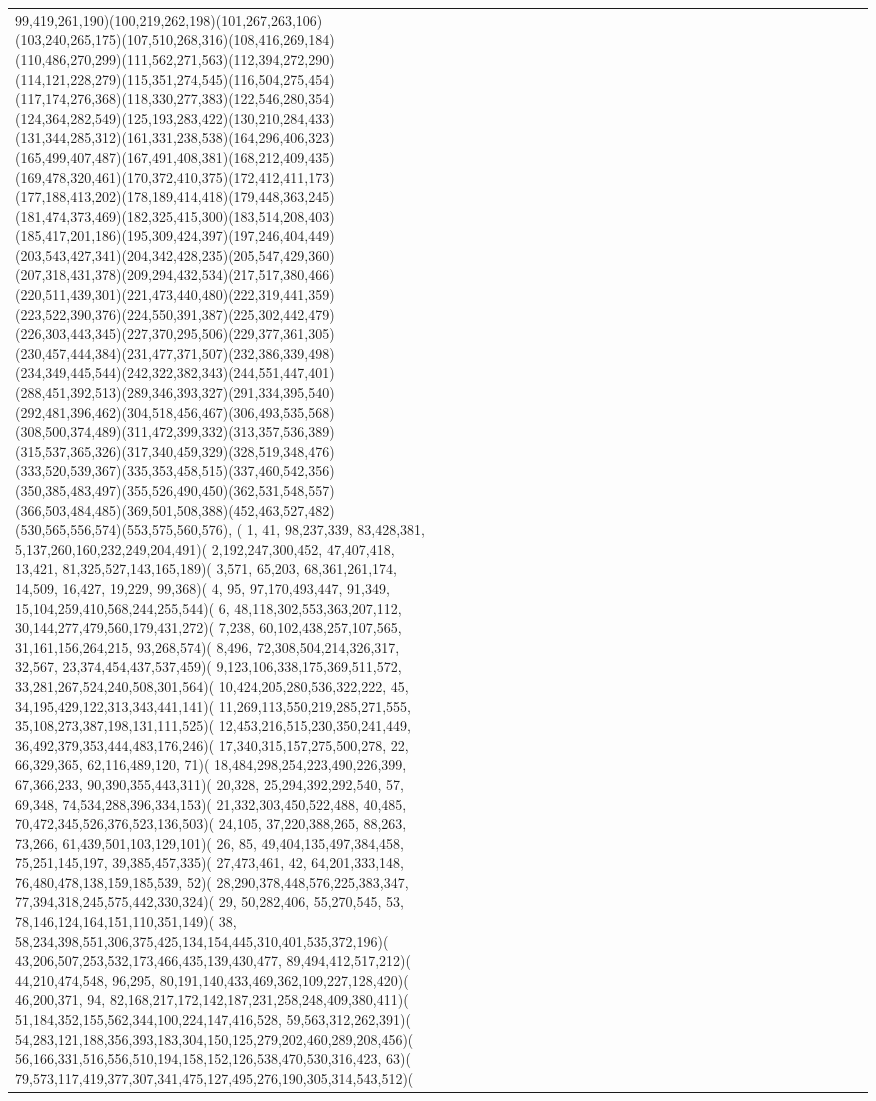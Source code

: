 \documentclass[varwidth=\maxdimen,border=10]{standalone}
\begin{document}
\begin{tabular}{@{}l@{}l@{}l@{}l@{}l@{}l@{}l@{}l@{}l@{}l@{}l@{}l@{}l@{}l@{}l@{}l@{}l@{}l@{}l@{}l@{}l@{}l@{}l@{}l@{}l@{}l@{}l@{}l@{}l@{}l@{}l@{}l@{}}
99,419,261,190)(100,219,262,198)(101,267,263,106)(103,240,265,175)(107,510,268,316)(108,416,269,184)(110,486,270,299)(111,562,271,563)(112,394,272,290)(114,121,228,279)(115,351,274,545)(116,504,275,454)(117,174,276,368)(118,330,277,383)(122,546,280,354)(124,364,282,549)(125,193,283,422)(130,210,284,433)(131,344,285,312)(161,331,238,538)(164,296,406,323)(165,499,407,487)(167,491,408,381)(168,212,409,435)(169,478,320,461)(170,372,410,375)(172,412,411,173)(177,188,413,202)(178,189,414,418)(179,448,363,245)(181,474,373,469)(182,325,415,300)(183,514,208,403)(185,417,201,186)(195,309,424,397)(197,246,404,449)(203,543,427,341)(204,342,428,235)(205,547,429,360)(207,318,431,378)(209,294,432,534)(217,517,380,466)(220,511,439,301)(221,473,440,480)(222,319,441,359)(223,522,390,376)(224,550,391,387)(225,302,442,479)(226,303,443,345)(227,370,295,506)(229,377,361,305)(230,457,444,384)(231,477,371,507)(232,386,339,498)(234,349,445,544)(242,322,382,343)(244,551,447,401)(288,451,392,513)(289,346,393,327)(291,334,395,540)(292,481,396,462)(304,518,456,467)(306,493,535,568)(308,500,374,489)(311,472,399,332)(313,357,536,389)(315,537,365,326)(317,340,459,329)(328,519,348,476)(333,520,539,367)(335,353,458,515)(337,460,542,356)(350,385,483,497)(355,526,490,450)(362,531,548,557)(366,503,484,485)(369,501,508,388)(452,463,527,482)(530,565,556,574)(553,575,560,576), (  1, 41, 98,237,339, 83,428,381,  5,137,260,160,232,249,204,491)(  2,192,247,300,452, 47,407,418, 13,421, 81,325,527,143,165,189)(  3,571, 65,203, 68,361,261,174, 14,509, 16,427, 19,229, 99,368)(  4, 95, 97,170,493,447, 91,349, 15,104,259,410,568,244,255,544)(  6, 48,118,302,553,363,207,112, 30,144,277,479,560,179,431,272)(  7,238, 60,102,438,257,107,565, 31,161,156,264,215, 93,268,574)(  8,496, 72,308,504,214,326,317, 32,567, 23,374,454,437,537,459)(  9,123,106,338,175,369,511,572, 33,281,267,524,240,508,301,564)( 10,424,205,280,536,322,222, 45, 34,195,429,122,313,343,441,141)( 11,269,113,550,219,285,271,555, 35,108,273,387,198,131,111,525)( 12,453,216,515,230,350,241,449, 36,492,379,353,444,483,176,246)( 17,340,315,157,275,500,278, 22, 66,329,365, 62,116,489,120, 71)( 18,484,298,254,223,490,226,399, 67,366,233, 90,390,355,443,311)( 20,328, 25,294,392,292,540, 57, 69,348, 74,534,288,396,334,153)( 21,332,303,450,522,488, 40,485, 70,472,345,526,376,523,136,503)( 24,105, 37,220,388,265, 88,263, 73,266, 61,439,501,103,129,101)( 26, 85, 49,404,135,497,384,458, 75,251,145,197, 39,385,457,335)( 27,473,461, 42, 64,201,333,148, 76,480,478,138,159,185,539, 52)( 28,290,378,448,576,225,383,347, 77,394,318,245,575,442,330,324)( 29, 50,282,406, 55,270,545, 53, 78,146,124,164,151,110,351,149)( 38, 58,234,398,551,306,375,425,134,154,445,310,401,535,372,196)( 43,206,507,253,532,173,466,435,139,430,477, 89,494,412,517,212)( 44,210,474,548, 96,295, 80,191,140,433,469,362,109,227,128,420)( 46,200,371, 94, 82,168,217,172,142,187,231,258,248,409,380,411)( 51,184,352,155,562,344,100,224,147,416,528, 59,563,312,262,391)( 54,283,121,188,356,393,183,304,150,125,279,202,460,289,208,456)( 56,166,331,516,556,510,194,158,152,126,538,470,530,316,423, 63)( 79,573,117,419,377,307,341,475,127,495,276,190,305,314,543,512)( 
\end{tabular}
\end{document}
